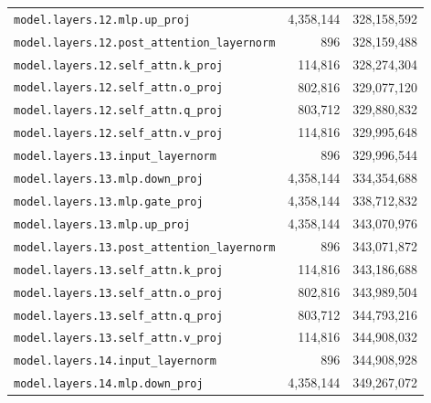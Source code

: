 \documentclass[10pt,a4paper]{article}
\theoremstyle{definition}
\begin{document}
\begin{appendices}
\begin{longtable}{p{9.5cm}rr}
\texttt{model.\allowbreak{}layers.\allowbreak{}12.\allowbreak{}mlp.\allowbreak{}up\_proj} & 4,358,144 & 328,158,592 \\
\texttt{model.\allowbreak{}layers.\allowbreak{}12.\allowbreak{}post\_attention\_layernorm} & 896 & 328,159,488 \\
\texttt{model.\allowbreak{}layers.\allowbreak{}12.\allowbreak{}self\_attn.\allowbreak{}k\_proj} & 114,816 & 328,274,304 \\
\texttt{model.\allowbreak{}layers.\allowbreak{}12.\allowbreak{}self\_attn.\allowbreak{}o\_proj} & 802,816 & 329,077,120 \\
\texttt{model.\allowbreak{}layers.\allowbreak{}12.\allowbreak{}self\_attn.\allowbreak{}q\_proj} & 803,712 & 329,880,832 \\
\texttt{model.\allowbreak{}layers.\allowbreak{}12.\allowbreak{}self\_attn.\allowbreak{}v\_proj} & 114,816 & 329,995,648 \\
\texttt{model.\allowbreak{}layers.\allowbreak{}13.\allowbreak{}input\_layernorm} & 896 & 329,996,544 \\
\texttt{model.\allowbreak{}layers.\allowbreak{}13.\allowbreak{}mlp.\allowbreak{}down\_proj} & 4,358,144 & 334,354,688 \\
\texttt{model.\allowbreak{}layers.\allowbreak{}13.\allowbreak{}mlp.\allowbreak{}gate\_proj} & 4,358,144 & 338,712,832 \\
\texttt{model.\allowbreak{}layers.\allowbreak{}13.\allowbreak{}mlp.\allowbreak{}up\_proj} & 4,358,144 & 343,070,976 \\
\texttt{model.\allowbreak{}layers.\allowbreak{}13.\allowbreak{}post\_attention\_layernorm} & 896 & 343,071,872 \\
\texttt{model.\allowbreak{}layers.\allowbreak{}13.\allowbreak{}self\_attn.\allowbreak{}k\_proj} & 114,816 & 343,186,688 \\
\texttt{model.\allowbreak{}layers.\allowbreak{}13.\allowbreak{}self\_attn.\allowbreak{}o\_proj} & 802,816 & 343,989,504 \\
\texttt{model.\allowbreak{}layers.\allowbreak{}13.\allowbreak{}self\_attn.\allowbreak{}q\_proj} & 803,712 & 344,793,216 \\
\texttt{model.\allowbreak{}layers.\allowbreak{}13.\allowbreak{}self\_attn.\allowbreak{}v\_proj} & 114,816 & 344,908,032 \\
\texttt{model.\allowbreak{}layers.\allowbreak{}14.\allowbreak{}input\_layernorm} & 896 & 344,908,928 \\
\texttt{model.\allowbreak{}layers.\allowbreak{}14.\allowbreak{}mlp.\allowbreak{}down\_proj} & 4,358,144 & 349,267,072 \\

\end{longtable}
\end{appendices}
\end{document}
